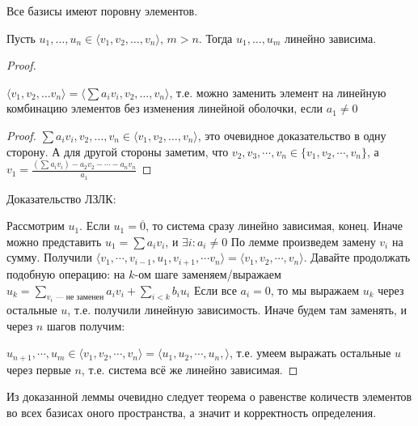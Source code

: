 \begin{theorem}
    Все базисы имеют поровну элементов.
\end{theorem}
\begin{lemma}
    Пусть $u_1, \ldots, u_n \in \langle v_1, v_2, \ldots, v_n \rangle$, $m > n$. Тогда  $u_1, \ldots, u_m$ линейно зависима.
\end{lemma}
\begin{proof}
	\begin{lemma}[О замене]
		$\langle v_1, v_2, \ldots v_n \rangle = \langle \sum a_i v_i, v_2, \ldots, v_n \rangle$, т.е. можно заменить элемент на линейную комбинацию элементов без изменения линейной оболочки, если $a_1 \neq 0$
    \end{lemma}
    \begin{proof}
	    $\sum a_i v_i, v_2, \ldots, v_n \in \langle v_1, v_2, \ldots, v_n \rangle$, это очевидное доказательство в одну сторону. А для другой стороны заметим, что $v_2, v_3, \cdots, v_n \in \lbrace v_1, v_2, \cdots, v_n \rbrace$, а $v_1 = \frac{(\sum a_i v_i) - a_2 v_2 - \cdots - a_n v_n}{a_1}$
    \end{proof}
    
    Доказательство ЛЗЛК:

    Рассмотрим $u_1$. Если $u_1 = \overline{0}$, то система сразу линейно зависимая, конец. Иначе можно представить $u_1 = \sum a_i v_i$, и $\exists i : a_i \neq 0$ По лемме произведем замену $v_i$ на сумму. Получили $\langle v_1, \cdots, v_{i-1}, u_1, v_{i+1}, \cdots v_n \rangle = \langle v_1, v_2, \cdots, v_n \rangle$. Давайте продолжать подобную операцию: на $k$-ом шаге заменяем/выражаем $u_k = \sum_{v_i \text{ --- не заменен}} a_i v_i + \sum_{i < k} b_i u_i$ Если все $a_i = 0$, то мы выражаем $u_k$ через остальные $u$, т.е. получили линейную зависимость. Иначе будем там заменять, и через $n$ шагов получим:

    $u_{n+1}, \cdots, u_m \in \langle v_1, v_2, \cdots, v_n \rangle = \langle u_1, u_2, \cdots, u_n, \rangle$, т.е. умеем выражать остальные $u$ через первые $n$, т.е. система всё же линейно зависимая.
\end{proof}

Из доказанной леммы очевидно следует теорема о равенстве количеств элементов во всех базисах оного пространства, а значит и корректность определения.